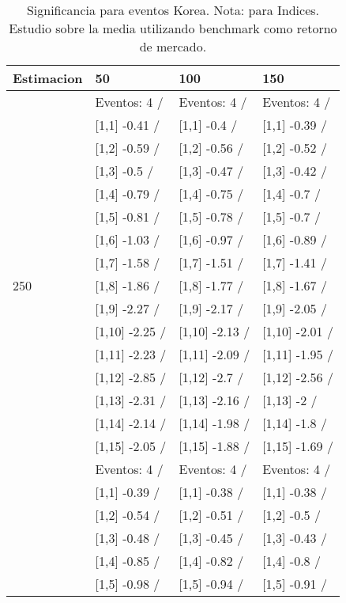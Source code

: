 \begin{table}

\caption{Significancia para eventos Korea. Nota: para Indices. Estudio sobre la media utilizando benchmark como retorno de mercado.}
\centering
\begin{tabular}[t]{llll}
\toprule
Estimacion & 50 & 100 & 150\\
\midrule
 & Eventos:  4 / & Eventos:  4 / & Eventos:  4 /\\
 & {}[1,1] -0.41  / & {}[1,1] -0.4  / & {}[1,1] -0.39  /\\
 & {}[1,2] -0.59  / & {}[1,2] -0.56  / & {}[1,2] -0.52  /\\
 & {}[1,3] -0.5  / & {}[1,3] -0.47  / & {}[1,3] -0.42  /\\
 & {}[1,4] -0.79  / & {}[1,4] -0.75  / & {}[1,4] -0.7  /\\
\addlinespace
 & {}[1,5] -0.81  / & {}[1,5] -0.78  / & {}[1,5] -0.7  /\\
 & {}[1,6] -1.03  / & {}[1,6] -0.97  / & {}[1,6] -0.89  /\\
 & {}[1,7] -1.58  / & {}[1,7] -1.51  / & {}[1,7] -1.41  /\\
250 & {}[1,8] -1.86  / & {}[1,8] -1.77  / & {}[1,8] -1.67  /\\
 & {}[1,9] -2.27  / & {}[1,9] -2.17  / & {}[1,9] -2.05  /\\
\addlinespace
 & {}[1,10] -2.25  / & {}[1,10] -2.13  / & {}[1,10] -2.01  /\\
 & {}[1,11] -2.23  / & {}[1,11] -2.09  / & {}[1,11] -1.95  /\\
 & {}[1,12] -2.85  / & {}[1,12] -2.7  / & {}[1,12] -2.56  /\\
 & {}[1,13] -2.31  / & {}[1,13] -2.16  / & {}[1,13] -2  /\\
 & {}[1,14] -2.14  / & {}[1,14] -1.98  / & {}[1,14] -1.8  /\\
\addlinespace
 & {}[1,15] -2.05  / & {}[1,15] -1.88  / & {}[1,15] -1.69  /\\
 & Eventos:  4 / & Eventos:  4 / & Eventos:  4 /\\
 & {}[1,1] -0.39  / & {}[1,1] -0.38  / & {}[1,1] -0.38  /\\
 & {}[1,2] -0.54  / & {}[1,2] -0.51  / & {}[1,2] -0.5  /\\
 & {}[1,3] -0.48  / & {}[1,3] -0.45  / & {}[1,3] -0.43  /\\
\addlinespace
 & {}[1,4] -0.85  / & {}[1,4] -0.82  / & {}[1,4] -0.8  /\\
 & {}[1,5] -0.98  / & {}[1,5] -0.94  / & {}[1,5] -0.91  /\\

\end{tabular}
\end{table}
